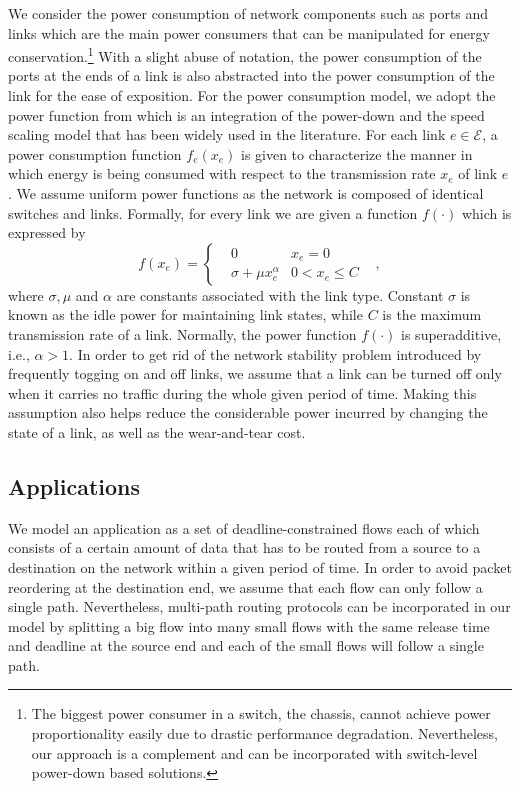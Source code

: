 \documentclass[10pt, conference, compsocconf]{IEEEtran}
\begin{document}
We consider the power consumption of network components such as ports and links which are the main power consumers that can be manipulated for energy conservation.\footnote{The biggest power consumer in a switch, the chassis, cannot achieve power proportionality easily due to drastic performance degradation. Nevertheless, our approach is a complement and can be incorporated with switch-level power-down based solutions.} With a slight abuse of notation, the power consumption of the ports at the ends of a link is also abstracted into the power consumption of the link for the ease of exposition. For the power consumption model, we adopt the power function from \cite{Andrews_Fernandez-SS-2010} which is an integration of the power-down and the speed scaling model that has been widely used in the literature. For each link $e \in \mathcal{E}$, a power consumption function $f_e(x_e)$ is given to characterize the manner in which energy is being consumed with respect to the transmission rate $x_e$ of link $e$. We assume uniform power functions as the network is composed of identical switches and links. Formally, for every link we are given a function $f(\cdot)$ which is expressed by
\begin{equation}
\label{eqn:power_func}
f(x_e) = \left\lbrace
\begin{aligned}
&0 & x_e = 0& \\
&\sigma + \mu x_e^{\alpha} & 0 < x_e \leq C & 
\end{aligned}
\right., 
\end{equation}
where $\sigma, \mu$ and $\alpha$ are constants associated with the link type. Constant $\sigma$ is known as the idle power for maintaining link states, while $C$ is the maximum transmission rate of a link.
Normally, the power function $f(\cdot)$ is superadditive, i.e., $\alpha > 1$. In order to get rid of the network stability problem introduced by frequently togging on and off links, we assume that a link can be turned off only when it carries no traffic during the whole given period of time. Making this assumption also helps reduce the considerable power incurred by changing the state of a link, as well as the wear-and-tear cost.

\subsection{Applications}

We model an application as a set of deadline-constrained flows each of which consists of a certain amount of data that has to be routed from a source to a destination on the network within a given period of time. In order to avoid packet reordering at the destination end, we assume that each flow can only follow a single path. Nevertheless, multi-path routing protocols can be incorporated in our model by splitting a big flow into many small flows with the same release time and deadline at the source end and each of the small flows will follow a single path.
\end{document}
